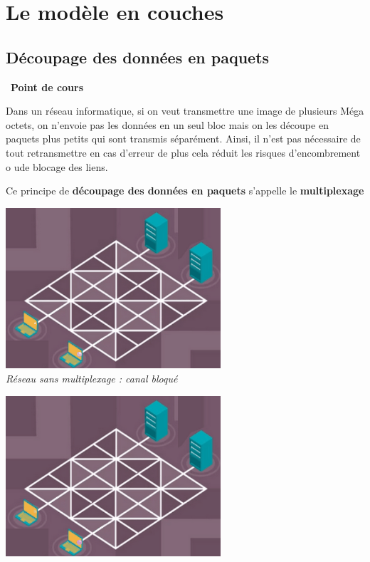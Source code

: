 \documentclass[
  11pt,
]{article}
\newcounter{cours}
\newenvironment{cours}[1]
{\par \medskip   \addtocounter{cours}{1} \noindent  
\begin{bclogo}[arrondi =0.1,  ombre = true, barre=none, logo=\bcbook, marge=4]{~\textbf{Point de cours} \textbf{\thecours} {\itshape #1} }  \par}
{
\end{bclogo}
 \par \bigskip }
\begin{document}
\hypertarget{le-moduxe8le-en-couches}{%
\section{Le modèle en couches}\label{le-moduxe8le-en-couches}}

\hypertarget{duxe9coupage-des-donnuxe9es-en-paquets}{%
\subsection{Découpage des données en
paquets}\label{duxe9coupage-des-donnuxe9es-en-paquets}}

\begin{cours}{}

Dans un réseau informatique, si on veut transmettre une image de
plusieurs Méga octets, on n'envoie pas les données en un seul bloc mais
on les découpe en paquets plus petits qui sont transmis séparément.
Ainsi, il n'est pas nécessaire de tout retransmettre en cas d'erreur de
plus cela réduit les risques d'encombrement o ude blocage des liens.

Ce principe de \textbf{découpage des données en paquets} s'appelle le
\textbf{multiplexage}

\end{cours}

\includegraphics[width=0.6\textwidth,height=\textheight]{images/multiplex2.gif}\\

\emph{Réseau sans multiplexage : canal bloqué}

\includegraphics[width=0.6\textwidth,height=\textheight]{images/multiplex4.gif}\\
\end{document}
